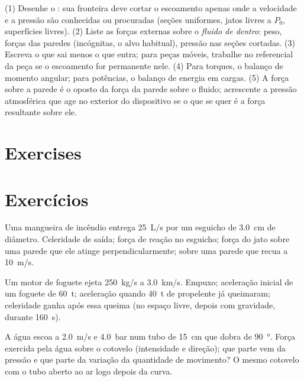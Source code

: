 \begin{method}\label{met:b2:flow-balances:method}
(1) Desenhe o : sua fronteira deve cortar o escoamento apenas
onde a velocidade e a pressão são conhecidas ou procuradas (seções uniformes,
jatos livres a $P_0$, superfícies livres). (2) Liste as forças externas sobre o
\emph{fluido de dentro}: peso, forças das paredes (incógnitas, o alvo habitual),
pressão nas seções cortadas. (3) Escreva o  que sai menos o que entra;
para peças móveis, trabalhe no referencial da peça se o escoamento for permanente
nele. (4) Para torques, o balanço de momento angular; para potências,
o balanço de energia em cargas. (5) A força sobre a parede é o oposto da força
da parede sobre o fluido; acrescente a pressão atmosférica que age no
exterior do dispositivo se o que se quer é a força resultante sobre ele.
\end{method}

\section{Exercises}
\section{Exercícios}
\begin{exercise}[$\star$]\label{exo:b2:flow-balances:1}
Uma mangueira de incêndio entrega \qty{25}{L/s} por um esguicho de \qty{3.0}{cm}
de diâmetro. Celeridade de saída; força de reação no esguicho; força do jato
sobre uma parede que ele atinge perpendicularmente; sobre uma parede que recua a \qty{10}{m/s}.
\end{exercise}

\begin{exercise}[$\star$]\label{exo:b2:flow-balances:2}
Um motor de foguete ejeta \qty{250}{kg/s} a \qty{3.0}{km/s}. Empuxo; aceleração
inicial de um foguete de \qty{60}{t}; aceleração quando \qty{40}{t} de
propelente já queimaram; celeridade ganha após essa queima (no espaço livre, depois
com gravidade, durante \qty{160}{s}).
\end{exercise}

\begin{exercise}[$\star$]\label{exo:b2:flow-balances:3}
A água escoa a \qty{2.0}{m/s} e \qty{4.0}{bar} num tubo de \qty{15}{cm} que
dobra de \qty{90}{\degree}. Força exercida pela água sobre o cotovelo
(intensidade e direção); que parte vem da pressão e que parte
da variação da quantidade de movimento? O mesmo cotovelo com o tubo aberto ao ar logo
depois da curva.
\end{exercise}

